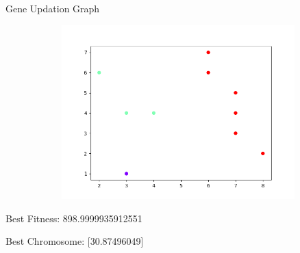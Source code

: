 \documentclass[12pt]{article}
\renewcommand{\_}{\kern-1.5pt\textunderscore\kern-1.5pt}
\begin{document}

\par


\vspace{\baselineskip}

\vspace{\baselineskip}
Gene Updation Graph\par




\begin{figure}[H]
	\begin{Center}
		\includegraphics[width=6.4in,height=2.65in]{./media/image5.png}
	\end{Center}
\end{figure}



\par

Best Fitness: 898.9999935912551\par

Best Chromosome: [30.87496049]\par


\vspace{\baselineskip}

\vspace{\baselineskip}

\vspace{\baselineskip}

\vspace{\baselineskip}

\vspace{\baselineskip}

\vspace{\baselineskip}
\end{document}
